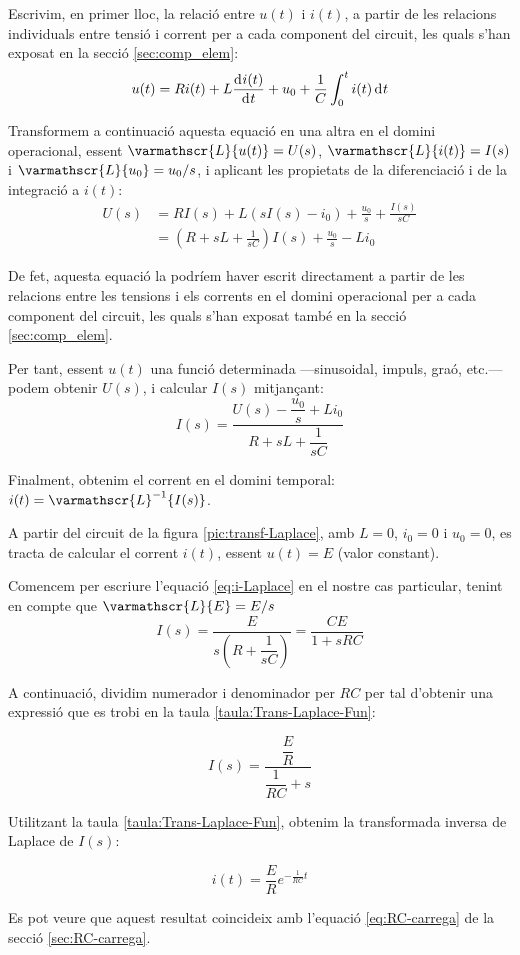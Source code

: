 Escrivim, en primer lloc,  la relació entre $u(t)$ i $i(t)$, a partir
de les relacions individuals entre tensió i corrent per a cada
component del circuit, les quals s'han exposat en la secció
\vref{sec:comp_elem}:
\begin{equation}
    u(t) = R i(t) + L \frac{\diff i(t)}{\diff t} + u_0 + \frac{1}{C}
    \int_0^t i(t) \diff t
\end{equation}

Transformem a continuació aquesta equació en una altra en el domini
operacional, essent $\varmathscr{L}\{u(t)\} = U(s)$,
$\varmathscr{L}\{i(t)\} = I(s)$ i $\varmathscr{L}\{u_0\} =
u_0/s$, i aplicant les propietats de la diferenciació i de la
integració a $i(t)$:
\begin{equation}\begin{split}
    U(s) &= R I(s) + L(s I(s) -i_0) + \frac{u_0}{s} + \frac{I(s)}{s
    C} \\[1ex]
    &= \left( R + s L +\frac{1}{s C}\right)I(s) + \frac{u_0}{s} - L i_0
\end{split}\end{equation}

De fet, aquesta equació la podríem haver escrit directament a
partir de les relacions entre les tensions i els corrents en el
domini operacional per a cada  component del circuit, les quals
s'han exposat també en la secció \ref{sec:comp_elem}.

Per tant, essent $u(t)$  una funció determinada  ---sinusoidal, impuls,
graó, etc.--- podem obtenir $U(s)$, i calcular $I(s)$ mitjançant:
\begin{equation}
    I(s) = \frac{U(s)-\dfrac{u_0}{s} + L i_0}{R + s L
    +\dfrac{1}{s C}}\label{eq:i-Laplace}
\end{equation}

Finalment, obtenim el corrent en el domini temporal: $i(t) =
\varmathscr{L}^{-1}\{I(s)\}$.

	
\begin{exemple}[\ResCircRC{}]
	\addcontentsxms{\ResCircRC}
    A partir del circuit de la figura \vref{pic:transf-Laplace}, amb
    $L=0$, $i_0=0$ i $u_0=0$, es tracta de calcular el corrent $i(t)$,
    essent $u(t)=E$ (valor constant).

    Comencem per escriure l'equació \eqref{eq:i-Laplace} en el nostre
    cas particular, tenint en compte que $\varmathscr{L}\{E\} = E/s$
    \[
        I(s) = \frac{E}{s\left(R + \dfrac{1}{s C}\right)} = \frac{C E}{1 + s R C}
    \]

    A continuació, dividim numerador i denominador per $R C$ per tal
    d'obtenir una expressió que es trobi en la taula
    \vref{taula:Trans-Laplace-Fun}:

    \[
        I(s) = \frac{\dfrac{E}{R}}{\dfrac{1}{R C} + s}
    \]

    Utilitzant la taula \vref{taula:Trans-Laplace-Fun}, obtenim la transformada inversa de Laplace de $I(s)$:

    \[
        i(t) = \frac{E}{R} e^{-\frac{1}{R C}t}
    \]

    Es pot veure que aquest resultat coincideix amb l'equació \eqref{eq:RC-carrega} de la secció \vref{sec:RC-carrega}.
\end{exemple}

